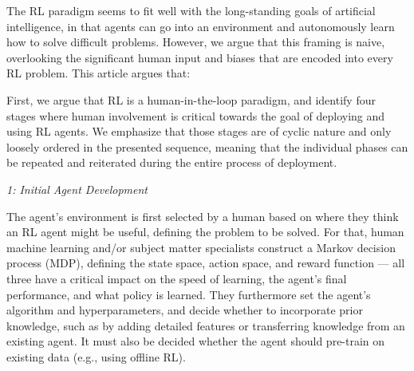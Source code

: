 \documentclass[twoside,11pt]{article}
\begin{document}
The RL paradigm seems to fit well with the long-standing goals of artificial intelligence, in that agents can go into an environment and autonomously learn how to solve difficult problems. However, we argue that this framing is naive, overlooking the significant human input and biases that are encoded into every RL problem. This article argues that: 
\begin{center}
\end{center}

First, we argue that RL is a human-in-the-loop paradigm, and identify four stages where human involvement is critical towards the goal of deploying and using RL agents. We emphasize that those stages are of cyclic nature and only loosely ordered in the presented sequence, meaning that the individual phases can be repeated and reiterated during the entire process of deployment.


\vspace{2mm}
\emph{1: Initial Agent Development}

The agent's environment is first selected by a human based on where they think an RL agent might be useful, defining the problem to be solved. For that, human machine learning and/or subject matter specialists construct a Markov decision process (MDP), defining the state space, action space, and reward function --- all three have a critical impact on the speed of learning, the agent's final performance, and what policy is learned. They furthermore set the agent's algorithm and hyperparameters, and decide whether to incorporate prior knowledge, such as by adding detailed features or transferring knowledge from an existing agent. It must also be decided whether the agent should pre-train on existing data (e.g., using offline RL).
\vspace{2mm}
\end{document}
